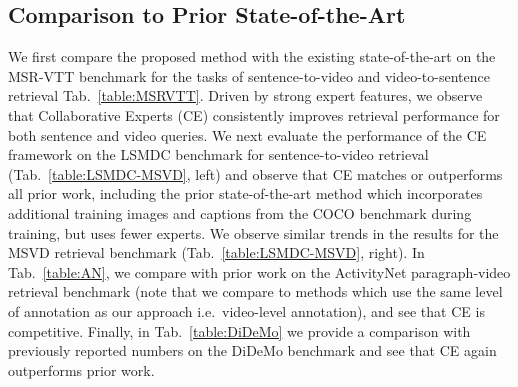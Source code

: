 \documentclass{bmvc2k}
\begin{document}
\normalsize 
\vspace{-0.2cm}
\subsection{Comparison to Prior State-of-the-Art} \label{subsec:sota}

We first compare the proposed method with the existing state-of-the-art on the MSR-VTT benchmark for the tasks of sentence-to-video and video-to-sentence retrieval Tab.~\ref{table:MSRVTT}.  Driven by strong expert features, we observe that Collaborative Experts (CE) consistently improves retrieval performance for both sentence and video queries.  We next evaluate the performance of the CE framework on the LSMDC benchmark for sentence-to-video retrieval (Tab.~\ref{table:LSMDC-MSVD}, left) and observe that CE matches or outperforms all prior work, including the prior state-of-the-art method \cite{miech2018learning} which incorporates additional training images and captions from the COCO benchmark during training, but uses fewer experts.  We observe similar trends in the results for the MSVD retrieval benchmark (Tab.~\ref{table:LSMDC-MSVD}, right). In Tab.~\ref{table:AN}, we compare with prior work on the ActivityNet paragraph-video retrieval benchmark (note that we compare to methods which use the same level of annotation as our approach i.e.\ video-level annotation), and see that CE is competitive.  Finally, in Tab.~\ref{table:DiDeMo} we provide a comparison with previously reported numbers on the DiDeMo benchmark and see that CE again outperforms prior work. 
\end{document}

